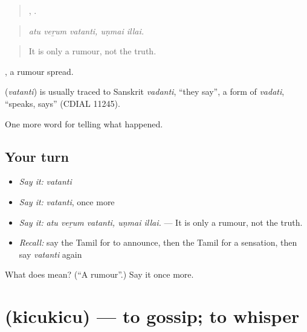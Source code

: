 \begin{quote}
  ,  .
\end{quote}

\begin{quote}
\emph{atu veṟum vatanti, uṇmai illai.}
\end{quote}

\begin{quote}
It is only a rumour, not the truth.
\end{quote}

 , a rumour spread.

\begin{cousinweb}
\textbf{} (\emph{vatanti}) is usually traced to Sanskrit \emph{vadanti}, \textquotedblleft{}they say\textquotedblright{}, a form of \emph{vadati}, \textquotedblleft{}speaks, says\textquotedblright{} (CDIAL 11245).
\end{cousinweb}

\begin{grammarlens}[title={What you've built}]
One more word for telling what happened.
\end{grammarlens}

\subsection*{Your turn}
\begin{itemize}
\raggedright
  \item \emph{Say it:} \emph{vatanti}
  \item \emph{Say it:} \emph{vatanti}, once more
  \item \emph{Say it:} \emph{atu veṟum vatanti, uṇmai illai.} — It is only a rumour, not the truth.
  \item \emph{Recall:} say the Tamil for to announce, then the Tamil for a sensation, then say \emph{vatanti} again
\end{itemize}

\begin{tcolorbox}[breakable,colback=teal!4,colframe=teal!35!black,title={Before you move on}]
What does  mean? (\textquotedblleft{}A rumour\textquotedblright{}.) Say it once more.
\end{tcolorbox}
\section[\texorpdfstring{\ta{கிசுகிசு} (kicukicu)}{கிசுகிசு (kicukicu)}]{ (kicukicu) — to gossip; to whisper}

